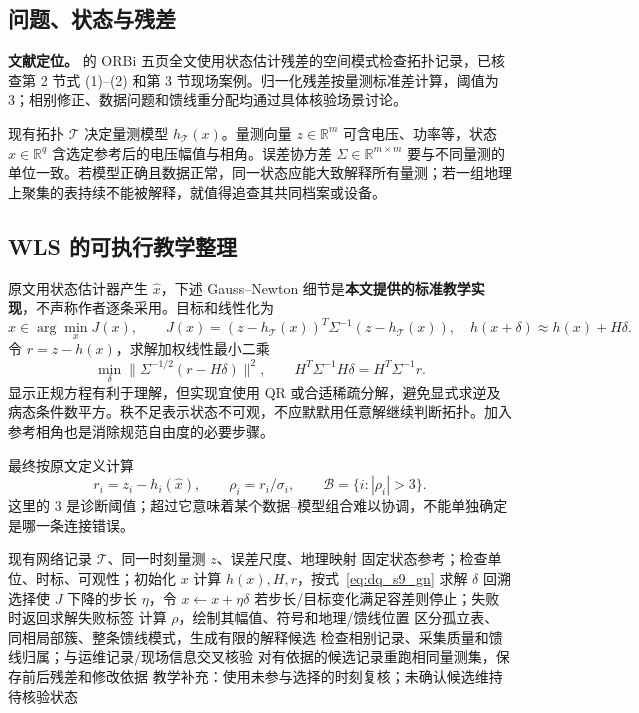 \documentclass[UTF8,11pt,fontset=fandol,openany,oneside]{ctexbook}
\newcommand{\R}{\mathbb{R}}
\theoremstyle{definition}
\theoremstyle{remark}
\numberwithin{equation}{chapter}
\begin{document}
\subsection{问题、状态与残差}

\textbf{文献定位。}\citet{S9} 的 ORBi 五页全文使用状态估计残差的空间模式检查拓扑记录，已核查第 2 节式 (1)--(2) 和第 3 节现场案例。归一化残差按量测标准差计算，阈值为 3；相别修正、数据问题和馈线重分配均通过具体核验场景讨论。

现有拓扑 $\mathcal T$ 决定量测模型 $h_{\mathcal T}(x)$。量测向量
$z\in\R^m$ 可含电压、功率等，状态 $x\in\R^q$ 含选定参考后的电压幅值与相角。误差协方差 $\Sigma\in\R^{m\times m}$ 要与不同量测的单位一致。若模型正确且数据正常，同一状态应能大致解释所有量测；若一组地理上聚集的表持续不能被解释，就值得追查其共同档案或设备。

\subsection{WLS 的可执行教学整理}

原文用状态估计器产生 $\hat x$，下述 Gauss--Newton 细节是\textbf{本文提供的标准教学实现}，不声称作者逐条采用。目标和线性化为
\begin{equation}
 \hat x\in\arg\min_xJ(x),\qquad
 J(x)=(z-h_{\mathcal T}(x))^T\Sigma^{-1}(z-h_{\mathcal T}(x)),
 \quad h(x+\delta)\approx h(x)+H\delta.
 \label{eq:dq_s9_wls}
\end{equation}
令 $r=z-h(x)$，求解加权线性最小二乘
\begin{equation}
 \min_\delta\|\Sigma^{-1/2}(r-H\delta)\|^2,
 \qquad H^T\Sigma^{-1}H\delta=H^T\Sigma^{-1}r.
 \label{eq:dq_s9_gn}
\end{equation}
显示正规方程有利于理解，但实现宜使用 QR 或合适稀疏分解，避免显式求逆及病态条件数平方。秩不足表示状态不可观，不应默默用任意解继续判断拓扑。加入参考相角也是消除规范自由度的必要步骤。

最终按原文定义计算
\begin{equation}
 r_i=z_i-h_i(\hat x),\qquad \rho_i=r_i/\sigma_i,\qquad
 \mathcal B=\{i:|\rho_i|>3\}.
 \label{eq:dq_s9_normalized}
\end{equation}
这里的 3 是诊断阈值；超过它意味着某个数据--模型组合难以协调，不能单独确定是哪一条连接错误。

\begin{algorithm}[tbp]
\caption{S9 的残差诊断链：现场流程整理，WLS 求解为教学实现}
\label{alg:dq_s9}
\begin{algorithmic}[1]
\Require 现有网络记录 $\mathcal T$、同一时刻量测 $z$、误差尺度、地理映射
\State 固定状态参考；检查单位、时标、可观性；初始化 $x$
 \State 计算 $h(x),H,r$，按式~\eqref{eq:dq_s9_gn} 求解 $\delta$
 \State 回溯选择使 $J$ 下降的步长 $\eta$，令 $x\gets x+\eta\delta$
 \State 若步长/目标变化满足容差则停止；失败时返回求解失败标签
\EndFor
\State 计算 $\rho$，绘制其幅值、符号和地理/馈线位置
\State 区分孤立表、同相局部簇、整条馈线模式，生成有限的解释候选
\State 检查相别记录、采集质量和馈线归属；与运维记录/现场信息交叉核验
\State 对有依据的候选记录重跑相同量测集，保存前后残差和修改依据
\State 教学补充：使用未参与选择的时刻复核；未确认候选维持待核验状态
\end{algorithmic}
\end{algorithm}
\end{document}
